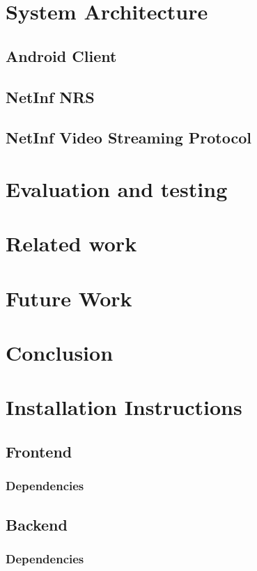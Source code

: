 \documentclass[11pt]{report}
\begin{document}
\chapter{System Architecture}

\section {Android Client}

\section {NetInf NRS}

\section {NetInf Video Streaming Protocol}
\chapter{Evaluation and testing}
\chapter{Related work}
\chapter{Future Work}
\chapter{Conclusion}
\chapter{Installation Instructions}
\section {Frontend}
\subsection {Dependencies}
\section {Backend}
\subsection {Dependencies}
\end{document}
